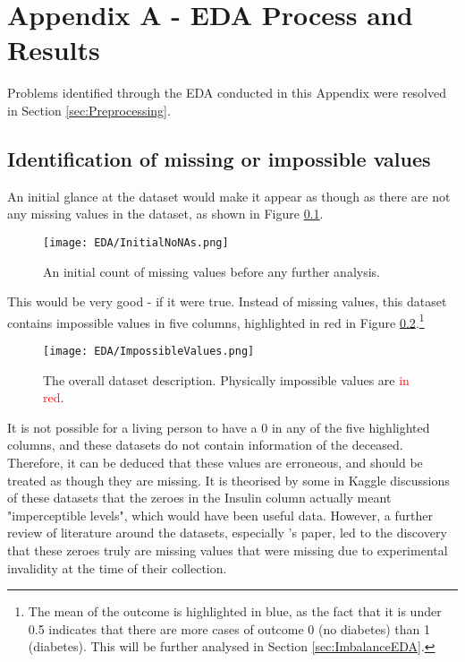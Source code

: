 \begingroup
\renewcommand\thechapter{A}
\titleformat{\chapter}[display]
{\normalfont\huge\bfseries}{}{20pt}{\Huge}
\setcounter{section}{0} %

\chapter*{Appendix A - EDA Process and Results}
Problems identified through the EDA conducted in this Appendix were resolved in Section \ref{sec:Preprocessing}.

\section{Identification of missing or impossible values}
An initial glance at the dataset would make it appear as though as there are not any missing values in the dataset, as shown in Figure \ref{fig:InitialNoNAs}.

\begin{figure}[H]
    \centering
    \texttt{[image: EDA/InitialNoNAs.png]}
    \caption{An initial count of missing values before any further analysis.}
    \label{fig:InitialNoNAs}
\end{figure}

\para This would be very good - if it were true. Instead of missing values, this dataset contains impossible values in five columns, highlighted in red in 
Figure \ref{fig:ImpossibleValues}.\footnote{The mean of the outcome is highlighted in blue, as the fact that it is under 0.5 indicates that there are more 
cases of outcome 0 (no diabetes) than 1 (diabetes). This will be further analysed in Section \ref{sec:ImbalanceEDA}.}

\begin{figure}[H]
    \centering
    \texttt{[image: EDA/ImpossibleValues.png]}
    \caption{The overall dataset description. Physically impossible values are \textcolor{red}{in red}.}
    \label{fig:ImpossibleValues}
\end{figure}

\para It is not possible for a living person to have a 0 in any of the five highlighted columns, and these datasets do not contain information of the deceased.
Therefore, it can be deduced that these values are erroneous, and should be treated as though they are missing. It is theorised by some in Kaggle discussions of these 
datasets that the zeroes in the Insulin column actually meant "imperceptible levels", which would have been useful data. However, a further review of literature around the datasets,
especially \textcite{hayashi_rule_2016}'s paper, led to the discovery that these zeroes truly are missing values that were missing due to experimental invalidity at the time 
of their collection.

